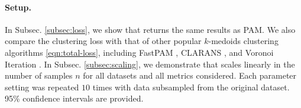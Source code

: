 \paragraph{Setup.} In Subsec. \ref{subsec:loss}, we show that \algname returns the same results as PAM. We also compare the clustering loss with that of other popular $k$-medoids clustering algorithms \eqref{eqn:total-loss}, including FastPAM \cite{schubert2019faster}, CLARANS \cite{ng2002clarans}, and Voronoi Iteration \cite{park2009simple}. 
In Subsec. \ref{subsec:scaling}, we demonstrate that \algname scales linearly in the number of samples $n$ for all datasets and all metrics considered. 
Each parameter setting was repeated $10$ times with data subsampled from the original dataset.
95\% confidence intervals are provided. 



